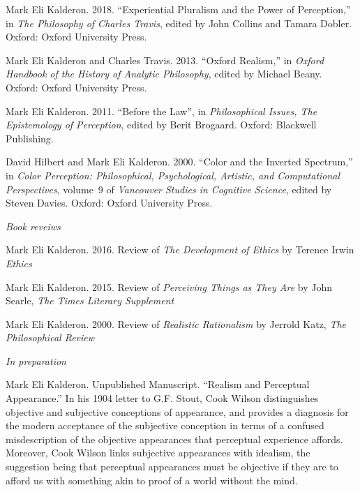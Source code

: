 \documentclass[11pt]{article}
\begin{document}
\ind Mark Eli Kalderon. 2018. ``Experiential Pluralism and the Power of Perception,'' in \emph{The Philosophy of Charles Travis}, edited by John Collins and Tamara Dobler. Oxford: Oxford University Press. 

\ind Mark Eli Kalderon and Charles Travis. 2013. ``Oxford Realism,''  in \emph{Oxford Handbook of the History of Analytic Philosophy}, edited by Michael Beany. Oxford: Oxford University Press.

\ind Mark Eli Kalderon. 2011. ``Before the Law'', in \emph{Philosophical Issues, The Epistemology of Perception}, edited by Berit Brogaard. Oxford: Blackwell Publishing.

\ind David Hilbert and Mark Eli Kalderon. 2000. ``Color and the Inverted Spectrum,'' in \emph{Color Perception: Philosophical, Psychological, Artistic, and Computational Perspectives}, volume~9 of \emph{Vancouver Studies in Cognitive Science}, edited by Steven Davies. Oxford: Oxford University Press.



\bigskip


\noindent\emph{Book reveiws \vspace{0.05in}}

\ind Mark Eli Kalderon. 2016. Review of \emph{The Development of Ethics} by Terence Irwin \emph{Ethics}

\ind Mark Eli Kalderon. 2015. Review of \emph{Perceiving Things as They Are} by John Searle, \emph{The Times Literary Supplement}

\ind Mark Eli Kalderon. 2000. Review of \emph{Realistic Rationalism} by Jerrold Katz, \emph{The Philosophical Review}



\bigskip 

 
\noindent\emph{In preparation \vspace{0.05in}}


\ind Mark Eli Kalderon. Unpublished Manuscript. ``Realism and Perceptual Appearance.'' In his 1904 letter to G.F. Stout, Cook Wilson distinguishes objective and subjective conceptions of appearance, and provides a diagnosis for the modern acceptance of the subjective conception in terms of a confused misdescription of the objective appearances that perceptual experience affords. Moreover, Cook Wilson links subjective appearances with idealism, the suggestion being that perceptual appearances must be objective if they are to afford us with something akin to proof of a world without the mind.
\end{document}
